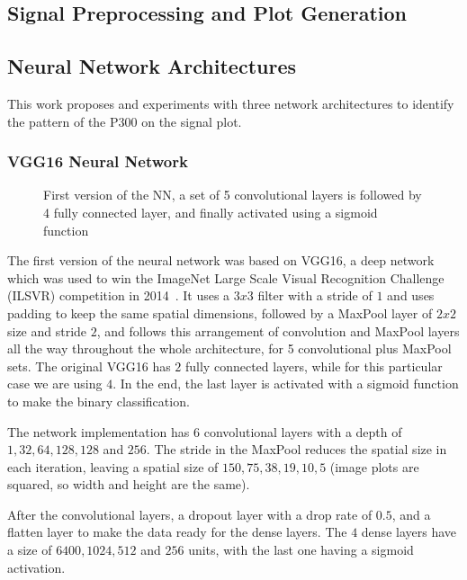 \documentclass[conference]{IEEEtran}
\begin{document}
\subsection{Signal Preprocessing and Plot Generation}

\subsection{Neural Network Architectures}

This work proposes and experiments with three network architectures to identify the pattern of the P300 on the signal plot.

\subsubsection{VGG16 Neural Network}

\begin{figure}[!t]

\caption[VGG16 Neural Network]{First version of the NN, a set of 5 convolutional layers is followed by 4 fully connected layer, and finally activated using a sigmoid function}
\label{fig:nnv1}
\end{figure}


The first version of the neural network was based on VGG16, a deep network which was used to win the ImageNet Large Scale Visual Recognition Challenge (ILSVR) competition in 2014~\cite{ilsvr2014}. It uses a $3x3$ filter with a stride of $1$ and uses padding to keep the same spatial dimensions, followed by a MaxPool layer of $2x2$ size and stride $2$, and follows this arrangement of convolution and MaxPool layers all the way throughout the whole architecture, for 5 convolutional plus MaxPool sets. The original VGG16 has $2$ fully connected layers, while for this particular case we are using $4$. In the end, the last layer is activated with a sigmoid function to make the binary classification. 

The network implementation has $6$ convolutional layers with a depth of $1, 32, 64, 128, 128$ and $256$. The stride in the MaxPool reduces the spatial size in each iteration, leaving a spatial size of $150, 75, 38, 19, 10, 5$ (image plots are squared, so width and height are the same). 

After the convolutional layers, a dropout layer with a drop rate of $0.5$, and a flatten layer to make the data ready for the dense layers. The $4$ dense layers have a size of $6400, 1024, 512$ and $256$ units, with the last one having a sigmoid activation.
\end{document}
